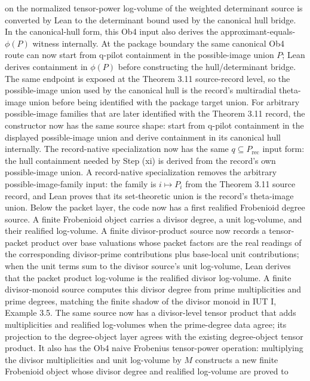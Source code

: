 \documentclass[11pt]{article}
\newcommand{\IUT}{IUT}
\newcommand{\Lean}{Lean}
\theoremstyle{plain}
\theoremstyle{definition}
\theoremstyle{remark}
\begin{document}
on the normalized tensor-power log-volume of the weighted determinant source is
converted by \Lean{} to the determinant bound used by the canonical hull bridge.
In the canonical-hull form, this Ob4 input also derives the
approximant-equals-\(\phi(P)\) witness internally.  At the package boundary
the same canonical Ob4 route can now start from q-pilot containment in the
possible-image union \(P\); \Lean{} derives containment in \(\phi(P)\) before
constructing the hull/determinant bridge.
The same endpoint is exposed at the Theorem 3.11 source-record level, so the
possible-image union used by the canonical hull is the record's multiradial
theta-image union before being identified with the package target union.
For arbitrary possible-image families that are later identified with the
Theorem 3.11 record, the constructor now has the same source shape: start from
q-pilot containment in the displayed possible-image union and derive containment
in its canonical hull internally.
The record-native specialization now has the same \(q\subseteq P_{\mathrm{rec}}\)
input form: the hull containment needed by Step (xi) is derived from the
record's own possible-image union.
A record-native specialization removes the arbitrary possible-image-family
input: the family is \(i\mapsto P_i\) from the Theorem 3.11 source record, and
\Lean{} proves that its set-theoretic union is the record's theta-image union.
Below the packet layer, the code now has a first realified Frobenioid degree
source.  A finite Frobenioid object carries a divisor degree, a unit
log-volume, and their realified log-volume.  A finite divisor-product source
now records a tensor-packet product over base valuations whose packet factors
are the real readings of the corresponding divisor-prime contributions plus
base-local unit contributions; when the unit terms sum to the divisor source's
unit log-volume, \Lean{} derives that the packet product log-volume is the
realified divisor log-volume.  A finite divisor-monoid source computes this
divisor degree from prime
multiplicities and prime degrees, matching the finite shadow of the divisor
monoid in \IUT{} I, Example 3.5.  The same source now has a divisor-level
tensor product that adds multiplicities and realified log-volumes when the
prime-degree data agree; its projection to the degree-object layer agrees with
the existing degree-object tensor product.
It also has the Ob4 naive Frobenius tensor-power operation: multiplying the
divisor multiplicities and unit log-volume by \(M\) constructs a new finite
Frobenioid object whose divisor degree and realified log-volume are proved to
\end{document}

